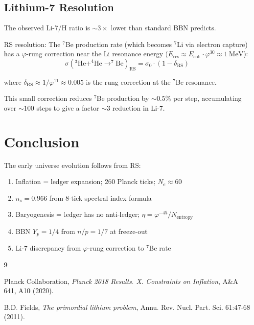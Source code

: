 \documentclass[12pt,a4paper]{article}
\theoremstyle{definition}
\theoremstyle{remark}
\begin{document}
\subsection{Lithium-7 Resolution}

The observed Li-7/H ratio is $\sim 3\times$ lower than standard BBN predicts.

RS resolution: The $^7$Be production rate (which becomes $^7$Li via electron capture) 
has a $\varphi$-rung correction near the Li resonance energy 
($E_\mathrm{res} \approx E_\mathrm{coh} \cdot \varphi^{30} \approx 1~\mathrm{MeV}$):
\begin{equation}
\sigma(^3\mathrm{He} + ^4\mathrm{He} \to ^7\mathrm{Be})_\mathrm{RS} = \sigma_0 \cdot (1 - \delta_\mathrm{RS})
\end{equation}

where $\delta_\mathrm{RS} \approx 1/\varphi^{11} \approx 0.005$ is the rung correction 
at the $^7$Be resonance.

This small correction reduces $^7$Be production by $\sim 0.5\%$ per step, 
accumulating over $\sim 100$ steps to give a factor $\sim 3$ reduction in Li-7.

\section{Conclusion}

The early universe evolution follows from RS:
\begin{enumerate}
\item Inflation = ledger expansion; 260 Planck ticks; $N_e \approx 60$
\item $n_s = 0.966$ from 8-tick spectral index formula
\item Baryogenesis = ledger has no anti-ledger; $\eta = \varphi^{-45}/N_\mathrm{entropy}$
\item BBN $Y_p = 1/4$ from $n/p = 1/7$ at freeze-out
\item Li-7 discrepancy from $\varphi$-rung correction to $^7$Be rate
\end{enumerate}

\begin{thebibliography}{9}

 Planck Collaboration, \emph{Planck 2018 Results. X. Constraints on Inflation}, 
A\&A 641, A10 (2020).

 B.D. Fields, \emph{The primordial lithium problem}, Annu. Rev. Nucl. Part. Sci. 
61:47-68 (2011).
\end{thebibliography}
\end{document}
